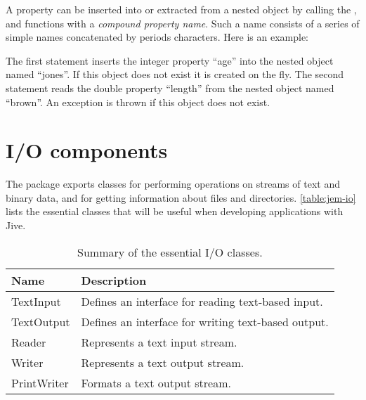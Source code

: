 A property can be inserted into or extracted from a nested
 object by calling the ,  and
 functions with a \emph{compound property name}. Such a name
consists of a series of simple names concatenated by periods characters.
Here is an example:


The first statement inserts the integer property ``age'' into the nested
 object named ``jones''. If this object does not exist
it is created on the fly. The second statement reads the double property
``length'' from the nested  object named ``brown''. An
exception is thrown if this object does not exist.


\section{I/O components}

The  package exports classes for performing operations on
streams of text and binary data, and for getting information about files
and directories. \autoref{table:jem-io} lists the essential classes that
will be useful when developing applications with Jive.

\begin{table}

  \caption{Summary of the essential I/O classes.}
  \label{table:jem-io}

  \begin{center}

    \begin{tabular}{|>{\ttfamily}lp{10cm}|}
      \hline
      Name        & Description \\
      \hline \hline
      TextInput   & Defines an interface for reading text-based
                    input. \\
      TextOutput  & Defines an interface for writing text-based
                    output. \\
      Reader      & Represents a text input stream. \\
      Writer      & Represents a text output stream. \\
      PrintWriter & Formats a text output stream. \\
      \hline
    \end{tabular}

  \end{center}

\end{table}

